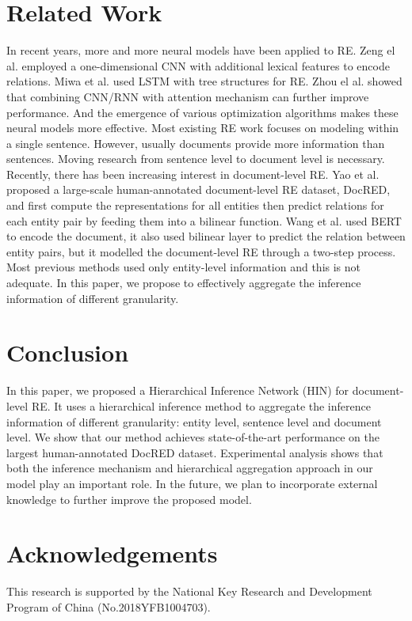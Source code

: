 \documentclass[runningheads]{llncs}
\begin{document}
\section{Related Work}
In recent years, more and more neural models have been applied to RE.
Zeng el al. \cite{Zeng2014RelationCV} employed a one-dimensional CNN with additional lexical features to encode relations.
Miwa et al. \cite{miwa2016end} used LSTM with tree structures for RE.
Zhou el al. \cite{zhou2016attention} 
showed that combining CNN/RNN with attention mechanism can further improve performance.
And the emergence of various optimization algorithms \cite{li2015lingo,li2017riemannian,li2017learning} makes these neural models more effective.
Most existing RE work focuses on modeling within a single sentence.
However, usually documents provide more information than sentences.
Moving research from sentence level to document level is necessary.
Recently, there has been increasing interest in document-level RE.
Yao et al. \cite{Yao2019DocREDAL} 
proposed a large-scale human-annotated document-level RE dataset, DocRED, 
and first compute the representations for all entities then predict relations for each entity pair by feeding them into a bilinear function.
Wang et al. \cite{wang2019fine} used BERT to encode the document, it also used bilinear layer to predict the relation between entity pairs,
but it modelled the document-level RE through a two-step process. 
Most previous methods used only entity-level information and this is not adequate. In this paper, we propose to effectively aggregate the inference information of different granularity. 

\section{Conclusion}
In this paper, we proposed a Hierarchical Inference Network (HIN) for document-level RE.
It uses a hierarchical inference method to aggregate the inference information of different granularity: entity level, sentence level and document level.
We show that our method achieves state-of-the-art performance on the largest human-annotated DocRED dataset.
Experimental analysis shows that both the inference mechanism and hierarchical aggregation approach in our model play an important role.
In the future, we plan to incorporate external knowledge to further improve the proposed model.

\section{Acknowledgements}

This research is supported by the National Key Research and Development Program of China (No.2018YFB1004703).



\end{document}
